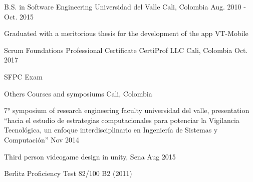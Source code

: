 

\begin{cventries}

  \cventry
    {B.S. in Software Engineering} %
    {Universidad del Valle} %
    {Cali, Colombia} %
    {Aug. 2010 - Oct. 2015} %
    {
      \begin{cvitems} %
        \item {Graduated with a meritorious thesis for the development of the app VT-Mobile}
      \end{cvitems}
    }


  \cventry
    {Scrum Foundations Professional Certificate} %
    {CertiProf LLC} %
    {Cali, Colombia} %
    { Oct. 2017} %
    {
      \begin{cvitems} %
        \item {SFPC Exam}
      \end{cvitems}
    }

 \cventry
    {Others} %
    {Courses and symposiums} %
    {Cali, Colombia} %
    {} %
    {
      \begin{cvitems} %
        \item {7° symposium of research engineering faculty universidad del valle, presentation “hacia el estudio de estrategias computacionales para potenciar la Vigilancia Tecnológica, un enfoque interdisciplinario en Ingeniería de Sistemas y Computación” Nov 2014}
        \item {Third person videogame design in unity, Sena Aug 2015}
        \item {Berlitz Proficiency Test 82/100  B2 (2011)}
      \end{cvitems}
    }

\end{cventries}
